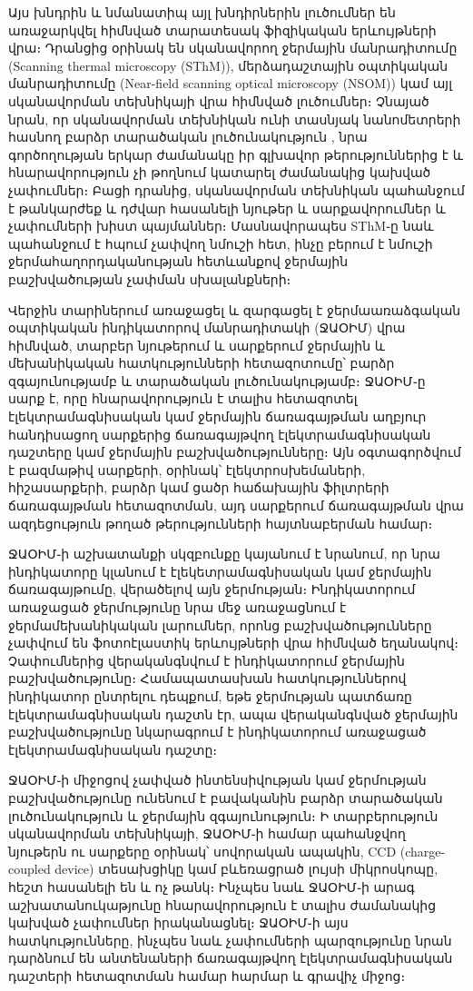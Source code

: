 \documentclass[12pt, fleqn]{report}
\begin{document}
Այս խնդրին և նմանատիպ այլ խնդիրներին լուծումներ են առաջարկվել հիմնված տարատեսակ ֆիզիկական երևույթների վրա։ Դրանցից օրինակ են սկանավորող ջերմային մանրադիտումը (Scanning thermal microscopy (SThM)), մերձադաշտային օպտիկական մանրադիտումը (Near-field scanning optical microscopy (NSOM)) կամ այլ սկանավորման տեխնիկայի վրա հիմնված լուծումներ։ Չնայած նրան, որ սկանավորման տեխնիկան ունի տասնյակ նանոմետրերի հասնող բարձր տարածական լուծունակություն \cite{yue2012nanoscalethermal}, նրա գործողության երկար ժամանակը իր գլխավոր թերություններից է և հնարավորություն չի թողնում կատարել ժամանակից կախված չափումներ։ Բացի դրանից, սկանավորման տեխնիկան պահանջում է թանկարժեք և դժվար հասանելի նյութեր և սարքավորումներ և չափումների խիստ պայմաններ։ Մասնավորապես SThM֊ը նաև պահանջում է հպում չափվող նմուշի հետ, ինչը բերում է նմուշի ջերմահաղորդականության հետևանքով ջերմային բաշխվածության չափման սխալանքների։

Վերջին տարիներում առաջացել և զարգացել է ջերմաառաձգական օպտիկական ինդիկատորով մանրադիտակի (ՋԱՕԻՄ) վրա հիմնված, տարբեր նյութերում և սարքերում ջերմային և մեխանիկական հատկությունների հետազոտումը՝  բարձր զգայունությամբ և տարածական լուծունակությամբ։ ՋԱՕԻՄ֊ը սարք է, որը հնարավորություն է տալիս հետազոտել էլեկտրամագնիսական կամ ջերմային ճառագայթման աղբյուր հանդիսացող սարքերից ճառագայթվող էլեկտրամագնիսական դաշտերը կամ ջերմային բաշխվածությունները։ Այն օգտագործվում է բազմաթիվ սարքերի, օրինակ՝ էլեկտրոսխեմաների, հիշասարքերի, բարձր կամ ցածր հաճախային ֆիլտրերի ճառագայթման հետազոտման, այդ սարքերում  ճառագայթման վրա ազդեցություն թողած թերությունների հայտնաբերման համար։

ՋԱՕԻՄ֊ի աշխատանքի սկզբունքը կայանում է նրանում, որ նրա ինդիկատորը կլանում է էլեկետրամագնիսական կամ ջերմային ճառագայթումը, վերածելով այն ջերմության։ Ինդիկատորում առաջացած ջերմությունը նրա մեջ առաջացնում է ջերմամեխանիկական լարումներ, որոնց բաշխվածությունները չափվում են ֆոտոէլաստիկ երևույթների վրա հիմնված եղանակով։ Չափումներից վերականգնվում է ինդիկատորում ջերմային բաշխվածությունը։ Համապատասխան հատկություններով ինդիկատոր ընտրելու դեպքում, եթե ջերմության պատճառը էլեկտրամագնիսական դաշտն էր, ապա վերականգնված ջերմային բաշխվածությունը նկարագրում է ինդիկատորում առաջացած էլեկտրամագնիսական դաշտը։

ՋԱՕԻՄ֊ի միջոցով չափված ինտենսիվության կամ ջերմության բաշխվածությունը ունենում է բավականին բարձր տարածական լուծունակություն և ջերմային զգայունություն։ Ի տարբերություն սկանավորման տեխնիկայի, ՋԱՕԻՄ֊ի համար պահանջվող նյութերն ու սարքերը օրինակ՝ սովորական ապակին, CCD (charge-coupled device) տեսախցիկը կամ բևեռացրած լույսի միկրոսկոպը, հեշտ հասանելի են և ոչ թանկ։ Ինչպես նաև ՋԱՕԻՄ֊ի արագ աշխատանուկաթյունը հնարավորություն է տալիս ժամանակից կախված չափումներ իրականացնել։ ՋԱՕԻՄ֊ի այս հատկությունները, ինչպես նաև չափումների պարզությունը նրան դարձնում են անտենաների ճառագայթվող էլեկտրամագնիսական դաշտերի հետազոտման համար հարմար և գրավիչ միջոց։
\end{document}

